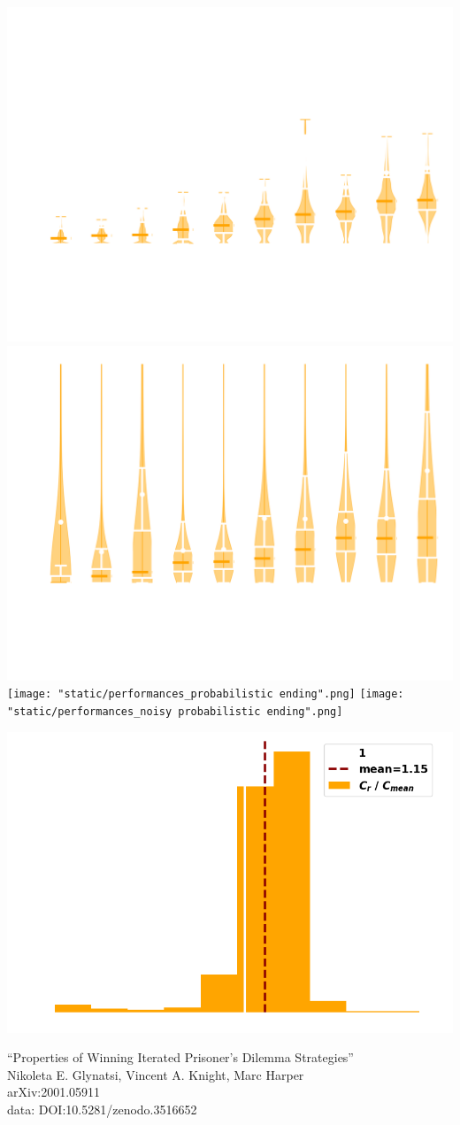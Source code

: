 \documentclass{beamer}
\begin{document}
\begin{frame}
    \begin{center}
        \includegraphics[width=.45\textwidth]{static/performances_standard.png}
        \includegraphics[width=.45\textwidth]{static/performances_noisy.png} \\
        \texttt{[image: "static/performances\_probabilistic ending".png]}
        \texttt{[image: "static/performances\_noisy probabilistic ending".png]}
    \end{center}
\end{frame}

\begin{frame}
    \begin{center}
        \includegraphics[width=.8\textwidth]{static/features.png}
    \end{center}
\end{frame}

\begin{frame}
    \begin{center}
        \large{``Properties of Winning Iterated Prisoner's Dilemma Strategies''} \\ \vspace{.5cm}
        \footnotesize{Nikoleta E. Glynatsi, Vincent A. Knight, Marc Harper} \\ \vspace{.5cm}
        \footnotesize{arXiv:2001.05911} \\ \vspace{.5cm}
        \footnotesize{data: DOI:10.5281/zenodo.3516652}
    \end{center}
\end{frame}
\end{document}
